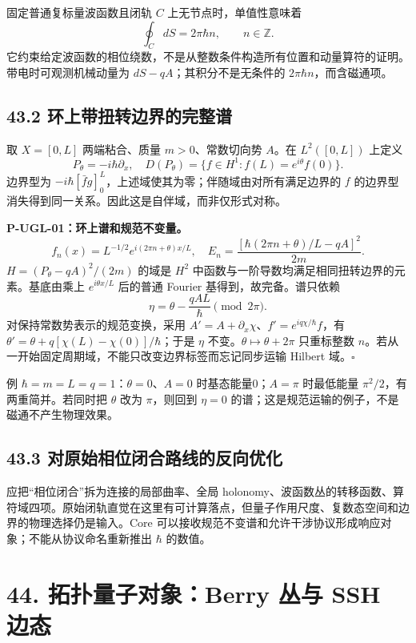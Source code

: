 \documentclass[
  11pt,
  oneside]{book}
\begin{document}
固定普通复标量波函数且闭轨 \(C\) 上无节点时，单值性意味着 \[
\oint_C dS=2\pi\hbar n,\qquad n\in\mathbb Z.
\]
它约束给定波函数的相位绕数，不是从整数条件构造所有位置和动量算符的证明。带电时可观测机械动量为
\(dS-qA\)；其积分不是无条件的 \(2\pi\hbar n\)，而含磁通项。

\section{43.2 环上带扭转边界的完整谱}

取 \(X=[0,L]\) 两端粘合、质量 \(m>0\)、常数切向势 \(A\)。在
\(L^2([0,L])\) 上定义 \[
P_\theta=-i\hbar\partial_x,
\quad D(P_\theta)=\{f\in H^1:f(L)=e^{i\theta}f(0)\}.
\] 边界型为
\(-i\hbar[\bar f g]_0^L\)，上述域使其为零；伴随域由对所有满足边界的
\(f\) 的边界型消失得到同一关系。因此这是自伴域，而非仅形式对称。

\protect\hypertarget{p-ugl-01}{}{}

\textbf{P-UGL-01：环上谱和规范不变量。} \[
f_n(x)=L^{-1/2}e^{i(2\pi n+\theta)x/L},\quad
E_n=\frac{[\hbar(2\pi n+\theta)/L-qA]^2}{2m}.
\] \(H=(P_\theta-qA)^2/(2m)\) 的域是 \(H^2\)
中函数与一阶导数均满足相同扭转边界的元素。基底由乘上 \(e^{i\theta x/L}\)
后的普通 Fourier 基得到，故完备。谱只依赖 \[
\eta=\theta-\frac{qAL}{\hbar}\pmod {2\pi}.
\] 对保持常数势表示的规范变换，采用
\(A'=A+\partial_x\chi\)、\(f'=e^{iq\chi/\hbar}f\)，有
\(\theta'=\theta+q[\chi(L)-\chi(0)]/\hbar\)；于是 \(\eta\)
不变。\(\theta\mapsto\theta+2\pi\) 只重标整数
\(n\)。若从一开始固定周期域，不能只改变边界标签而忘记同步运输 Hilbert
域。\(\square\)

例 \(\hbar=m=L=q=1\)：\(\theta=0\)、\(A=0\) 时基态能量0；\(A=\pi\)
时最低能量 \(\pi^2/2\)，有两重简并。若同时把 \(\theta\) 改为
\(\pi\)，则回到 \(\eta=0\)
的谱；这是规范运输的例子，不是磁通不产生物理效果。

\section{43.3 对原始相位闭合路线的反向优化}

应把``相位闭合''拆为连接的局部曲率、全局
holonomy、波函数丛的转移函数、算符域四项。原始闭轨直觉在这里有可计算落点，但量子作用尺度、复数态空间和边界的物理选择仍是输入。Core
可以接收规范不变谱和允许干涉协议形成响应对象；不能从协议命名重新推出
\(\hbar\) 的数值。

\chapter{44. 拓扑量子对象：Berry 丛与 SSH 边态}\label{ch-44}\hypertarget{ch-44}{}
\end{document}
